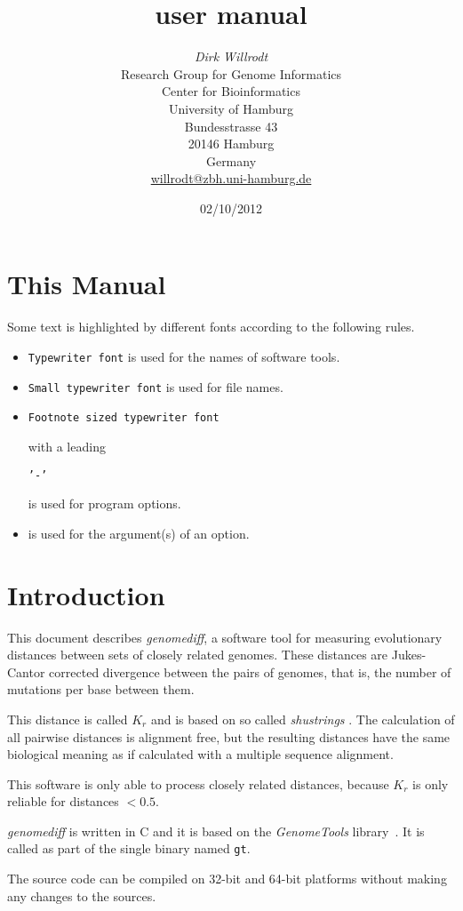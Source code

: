\documentclass[12pt,titlepage]{article}
\title{\Gdiff user manual}
\author{\begin{tabular}{c}
  \textit{Dirk Willrodt}\\[1cm]
  Research Group for Genome Informatics\\
  Center for Bioinformatics\\
  University of Hamburg\\
  Bundesstrasse 43\\
  20146 Hamburg\\
  Germany\\[1cm]
  \url{willrodt@zbh.uni-hamburg.de}\\
\end{tabular}}
\date{02/10/2012}
\newcommand{\Gdiff}{\textit{genomediff}\xspace}
\newcommand{\GenomeTools}{\textit{GenomeTools}\xspace}
\newcommand{\Gt}{\texttt{gt}\xspace}
\newcommand{\Kr}{\ensuremath{K_r}\xspace}
\newcommand{\File}[1]{\texttt{\small #1}}
\newcommand{\ShuS}{\textit{shustrings}\xspace}
\begin{document}
\maketitle

\section*{This Manual}
Some text is highlighted by different fonts according to the following rules.

\begin{itemize}
\item \texttt{Typewriter font} is used for the names of software tools.
\item \File{Small typewriter font} is used for file names.
\item \begin{footnotesize}\texttt{Footnote sized typewriter font}
      \end{footnotesize} with a leading
      \begin{footnotesize}\texttt{'-'}\end{footnotesize}
      is used for program options.
\item {} is used for the argument(s) of an
      option.
\end{itemize}


\section{Introduction}
This document describes \Gdiff, a software tool for measuring evolutionary
distances between sets of closely related genomes. These distances are
Jukes-Cantor corrected divergence between the pairs of genomes, that is, the
number of mutations per base between them.

This distance is called \Kr and is based on so called \ShuS
\cite{HAU:DOM:WIE:2008,HAU:PFA:DOM:WIE:2009,HAU:REE:PFA:2011}. The calculation
of all pairwise distances is alignment free, but the resulting distances have
the same biological meaning as if calculated with a multiple sequence alignment.

This software is only able to process closely related distances, because \Kr is
only reliable for distances $<0.5$.

\Gdiff is written in C and it is based on the \GenomeTools
library~\cite{genometools}. It is called as part of the single binary named \Gt.

The source code can be compiled on 32-bit and 64-bit platforms without making
any changes to the sources.
\end{document}
